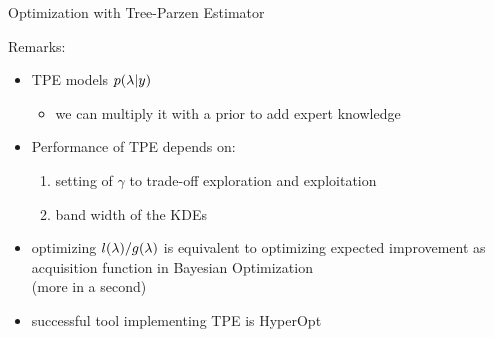 \begin{frame}[c,fragile]{Optimization with Tree-Parzen Estimator }


Remarks:

\begin{itemize}
	\item TPE models $p(\mathbf{\lambda} | y)$
	\begin{itemize}
		\item we can multiply it with a prior to add expert knowledge
	\end{itemize}
	\smallskip
	\pause
	\item Performance of TPE depends on:
	\begin{enumerate}
		\item setting of $\gamma$ to trade-off exploration and exploitation
		\item band width of the KDEs 
	\end{enumerate}
	\pause
	\smallskip
	\item optimizing $l(\mathbf{\lambda})/g(\mathbf{\lambda})$ is equivalent to optimizing expected improvement as acquisition function in Bayesian Optimization\\ (more in a second)
	\pause
	\smallskip
	\item successful tool implementing TPE is HyperOpt
\end{itemize}

\end{frame}
